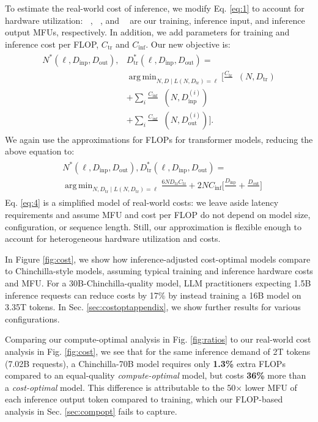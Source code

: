 \documentclass{article}
\theoremstyle{plain}
\theoremstyle{definition}
\theoremstyle{remark}
\DeclareMathOperator*{\argmin}{arg\,min}
\newcommand{\Dtr}{D_{\text{tr}}}
\newcommand{\Dtropt}{D_{\text{tr}}^*}
\newcommand{\Dinp}{D_{\text{inp}}}
\newcommand{\Dout}{D_{\text{out}}}
\DeclareMathOperator*{\Tf}{T_{\text{FLOPs}}}
\DeclareMathOperator*{\If}{I_{\text{FLOPs}}}
\DeclareMathOperator*{\Utr}{MFU_\text{tr}}
\DeclareMathOperator*{\Uinp}{MFU_\text{inp}}
\DeclareMathOperator*{\Uout}{MFU_\text{out}}
\newcommand{\Ctr}{C_\text{tr}}
\newcommand{\Cinf}{C_\text{inf}}
\begin{document}
To estimate the real-world cost of inference, we modify Eq. \ref{eq:1} to account for hardware utilization: $\Utr$, $\Uinp$, and $\Uout$ are our training, inference input, and inference output MFUs, respectively. In addition, we add parameters for training and inference cost per FLOP, $C_\text{tr}$ and $C_\text{inf}$.  Our new objective is:
\begin{align}
\label{eq:3}
\begin{split}
N^*(\ell, \Dinp, \Dout), &\Dtropt(\ell,\Dinp, \Dout) =\\
&\argmin_{N, D \mid L(N, \Dtr) = \ell} \Bigg[\frac{\Ctr}{\Utr} \Tf(N, \Dtr)\\
&+ \sum_{i}^{} \frac{\Cinf}{\Uinp}\If(N, D_{\text{inp}}^{(i)})\\
&+ \sum_{i}^{} \frac{\Cinf}{\Uout}\If(N, D_{\text{out}}^{(i)})\Bigg].
\end{split}
\end{align}
We again use the approximations for FLOPs for transformer models, reducing the above equation to:
\begin{align}
\label{eq:4}
\begin{split}
&N^*(\ell, \Dinp, \Dout), D_{\text{tr}}^{*}(\ell, \Dinp, \Dout) =\\
&\argmin_{N, \Dtr \mid L(N, \Dtr) = \ell}\frac{6 N \Dtr\Ctr}{\Utr} + 2N\Cinf\bigg[\frac{\Dinp}{\Uinp} + \frac{\Dout}{\Uout}\bigg]
\end{split}
\end{align}
Eq. \ref{eq:4} is a simplified model of real-world costs: we leave aside latency requirements and assume MFU and cost per FLOP do not depend on model size, configuration, or sequence length. Still, our approximation is flexible enough to account for heterogeneous hardware utilization and costs.

In Figure \ref{fig:cost}, we show how inference-adjusted cost-optimal models compare to Chinchilla-style models, assuming typical training and inference hardware costs and MFU. For a 30B-Chinchilla-quality model, LLM practitioners expecting 1.5B inference requests can reduce costs by 17$\%$ by instead training a 16B model on 3.35T tokens.
In Sec. \ref{sec:costoptappendix}, we show further results for various configurations.  

Comparing our compute-optimal analysis in Fig. \ref{fig:ratios} to our real-world cost analysis in Fig. \ref{fig:cost}, we see that for the same inference demand of 2T tokens (7.02B requests), a Chinchilla-70B model requires only \textbf{1.3\%} extra FLOPs compared to an equal-quality \textit{compute-optimal} model, but costs \textbf{36\%} more than a \textit{cost-optimal} model. This difference is attributable to the 50$\times$ lower MFU of each inference output token compared to training, which our FLOP-based analysis in Sec. \ref{sec:compopt} fails to capture.
\end{document}
